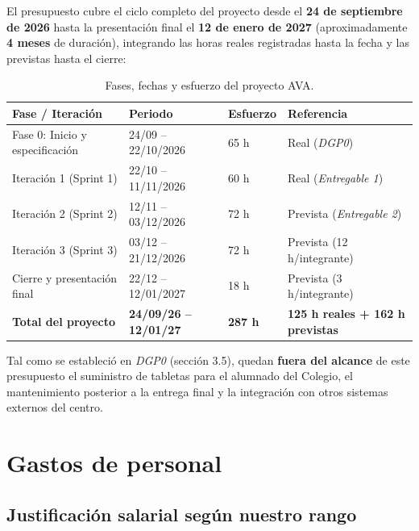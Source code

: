 \documentclass[11pt,a4paper]{article}
\begin{document}
El presupuesto cubre el ciclo completo del proyecto desde el \textbf{24 de septiembre de 2026} hasta la presentación final el \textbf{12 de enero de 2027} (aproximadamente \textbf{4 meses} de duración), integrando las horas reales registradas hasta la fecha y las previstas hasta el cierre:

\begin{table}[H]
  \centering
  \caption{Fases, fechas y esfuerzo del proyecto AVA.}
  \label{tab:fases}
  \begin{tabularx}{\linewidth}{@{}L{4.5cm} C{3.4cm} C{1.8cm} Y@{}}
    \toprule
    \textbf{Fase / Iteración} & \textbf{Periodo} & \textbf{Esfuerzo} & \textbf{Referencia} \\
    \midrule
    Fase 0: Inicio y especificación & 24/09 -- 22/10/2026 & 65 h & Real (\textit{DGP0}) \\
    Iteración 1 (Sprint 1) & 22/10 -- 11/11/2026 & 60 h & Real (\textit{Entregable 1}) \\
    Iteración 2 (Sprint 2) & 12/11 -- 03/12/2026 & 72 h & Prevista (\textit{Entregable 2}) \\
    Iteración 3 (Sprint 3) & 03/12 -- 21/12/2026 & 72 h & Prevista (12 h/integrante) \\
    Cierre y presentación final & 22/12 -- 12/01/2027 & 18 h & Prevista (3 h/integrante) \\
    \midrule
    \textbf{Total del proyecto} & \textbf{24/09/26 -- 12/01/27} & \textbf{287 h} & \textbf{125 h reales + 162 h previstas} \\
    \bottomrule
  \end{tabularx}
\end{table}

Tal como se estableció en \textit{DGP0} (sección 3.5), quedan \textbf{fuera del alcance} de este presupuesto el suministro de tabletas para el alumnado del Colegio, el mantenimiento posterior a la entrega final y la integración con otros sistemas externos del centro.

\section{Gastos de personal}

\subsection{Justificación salarial según nuestro rango}
\end{document}
